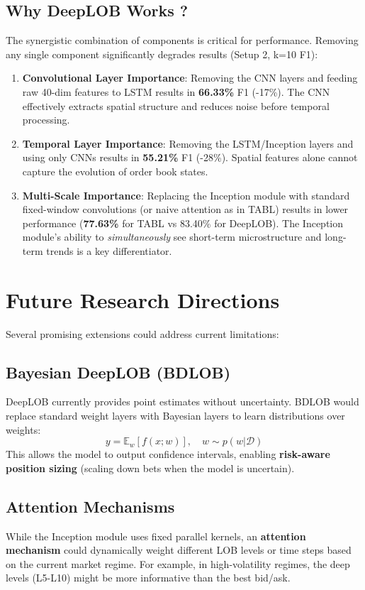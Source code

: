 \documentclass[10pt]{article}
\begin{document}
\subsection{Why DeepLOB Works ?}
The synergistic combination of components is critical for performance. Removing any single component significantly degrades results (Setup 2, k=10 F1):
\begin{enumerate}
    \item \textbf{Convolutional Layer Importance}: Removing the CNN layers and feeding raw 40-dim features to LSTM results in \textbf{66.33\%} F1 (-17\%). The CNN effectively extracts spatial structure and reduces noise before temporal processing.
    \item \textbf{Temporal Layer Importance}: Removing the LSTM/Inception layers and using only CNNs results in \textbf{55.21\%} F1 (-28\%). Spatial features alone cannot capture the evolution of order book states.
    \item \textbf{Multi-Scale Importance}: Replacing the Inception module with standard fixed-window convolutions (or naive attention as in TABL) results in lower performance (\textbf{77.63\%} for TABL vs 83.40\% for DeepLOB). The Inception module's ability to \emph{simultaneously} see short-term microstructure and long-term trends is a key differentiator.
\end{enumerate}

\section{Future Research Directions}

Several promising extensions could address current limitations:

\subsection{Bayesian DeepLOB (BDLOB)}
DeepLOB currently provides point estimates without uncertainty. 
BDLOB would replace standard weight layers with Bayesian layers to learn distributions over weights:
\[ y = \mathbb{E}_w[f(x; w)], \quad w \sim p(w|\mathcal{D}) \]
This allows the model to output confidence intervals, enabling \textbf{risk-aware position sizing} (scaling down bets when the model is uncertain).

\subsection{Attention Mechanisms}
While the Inception module uses fixed parallel kernels, an \textbf{attention mechanism} could dynamically weight different LOB levels or time steps based on the current market regime. 
For example, in high-volatility regimes, the deep levels (L5-L10) might be more informative than the best bid/ask.
\end{document}
